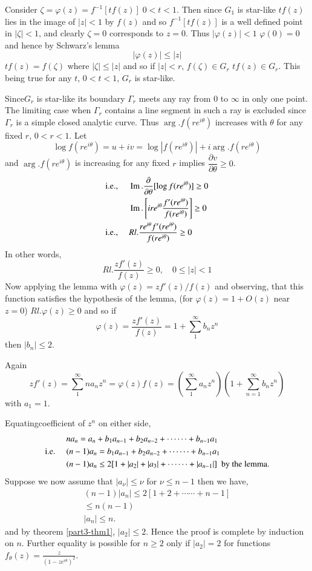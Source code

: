 Consider $\zeta=\varphi(z)=f^{-1}[tf(z)] \; 0<t<1$. Then since $G_{1}$ is
star-like $t$\;$f(z)$ lies in the image of $|z|<1$ by $f(z)$ and so
$f^{-1}[tf(z)]$ is a well defined point in $|\zeta|<1$, and clearly
$\zeta=0$ corresponds to $z=0$. Thus $|\varphi(z)|<1$\;\; $\varphi(0)=0$
and hence by Schwarz's lemma
$$
|\varphi(z)|\leq |z|
$$
$tf(z)=f(\zeta)$ where $|\zeta|\leq |z|$ and so if $|z|<r$,
$f(\zeta)\in G_{r}$ \ie $tf(z)\in G_{r}$. This being true for any $t$,
$0<t<1$, $G_{r}$ is star-like.

Since\pageoriginale $G_{r}$ is star-like its boundary $\Gamma_{r}$
meets any ray from $0$ to $\infty$ in only one point. The limiting
case when $\Gamma_{r}$ contains a line segment in such a ray is
excluded since $\Gamma_{r}$ is a simple closed analytic curve. Thus
$\arg.f(re^{i\theta})$ increases with $\theta$ for any fixed $r$,
$0<r<1$. Let
$$
\log f(re^{i\theta})=u+iv=\log|f(re^{i\theta})|+i\arg.f(re^{i\theta})
$$
and $\arg.f(re^{i\theta})$ is increasing for any fixed $r$ implies
$\dfrac{\partial v}{\partial \theta}\geq 0$.
\begin{align*}
\text{{i.e.,}\kern.3em}\quad &\operatorname{Im}.\frac{\partial}{\partial \theta}[\log
  f(re^{i\theta})]\geq 0\\
&\operatorname{Im}. \left[ire^{i\theta}\frac{f'(re^{i\theta})}{f(re^{i\theta})}\right]\geq
0\\
\text{{i.e.,}\kern.3em}\quad &
Rl.\frac{re^{i\theta}f'(re^{i\theta})}{f(re^{i\theta})}\geq 0
\end{align*}
In other words,
$$
Rl.\dfrac{zf'(z)}{f(z)}\geq 0,\quad 0\leq |z|<1
$$
Now applying the lemma with $\varphi(z)=zf'(z)/f(z)$ and observing,
that this function satisfies the hypothesis of the lemma, (for
$\varphi(z)=1+O(z)$ near $z=0$) $Rl.\varphi(z)\geq 0$ and so if
$$
\varphi(z)=\frac{zf'(z)}{f(z)}=1+\sum^{\infty}_{1}b_{n}z^{n}
$$
then $|b_{n}|\leq 2$.

Again
$$
zf'(z)=\sum^{\infty}_{1}na_{n}z^{n}=\varphi(z)f(z)=\left(\sum^{\infty}_{1}a_{n}z^{n}\right)\left(1+\sum^{\infty}_{n=1}b_{n}z^{n}\right)
$$
with $a_{1}=1$.

Equating\pageoriginale coefficient of $z^{n}$ on either side,
\begin{align*}
& na_{n}=a_{n}+b_{1}a_{n-1}+b_{2}a_{n-2}+\cdots\cdots+b_{n-1}a_{1}\\
\text{{i.e.}\kern.3em}\quad &
(n-1)a_{n}=b_{1}a_{n-1}+b_{2}a_{n-2}+\cdots\cdots+b_{n-1}a_{1}\\
& (n-1)a_{n}\leq 2[1+|a_{2}|+|a_{3}|+\cdots\cdots+|a_{n-1}|] \text{
  \ by the lemma.}
\end{align*}
Suppose we now assume that $|a_{\nu}|\leq \nu$ for $\nu\leq n-1$ then
we have,
\begin{gather*}
(n-1)|a_{n}|\leq 2[1+2+\cdots\cdots+n-1]\\
\leq n(n-1)\\
|a_{n}|\leq n.
\end{gather*}
and by theorem \ref{part3-thm1}, $|a_{2}|\leq 2$. Hence the proof is
complete by induction on $n$. Further equality is possible for $n\geq
2$ only if $|a_{2}|=2$ \ie for functions
$f_{\theta}(z)=\frac{z}{(1-ze^{i\theta})^{2}}$. 

